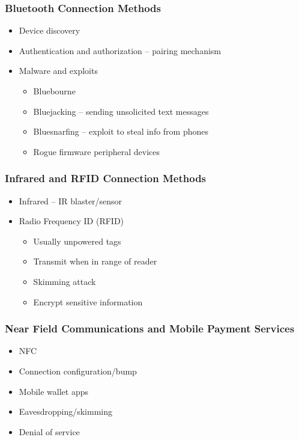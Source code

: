 		\subsubsection {Bluetooth Connection Methods}
			\begin{itemize}
				\item Device discovery
				\item Authentication and authorization -- pairing mechanism
				\item Malware and exploits
					\begin{itemize}
						\item Bluebourne
						\item Bluejacking -- sending unsolicited text messages
						\item Bluesnarfing -- exploit to steal info from phones
						\item Rogue firmware peripheral devices
					\end{itemize}
			\end{itemize}
		\subsubsection {Infrared and RFID Connection Methods}
			\begin{itemize}
				\item Infrared -- IR blaster/sensor
				\item Radio Frequency ID (RFID)
					\begin{itemize}
						\item Usually unpowered tags
						\item Transmit when in range of reader
						\item Skimming attack
						\item Encrypt sensitive information
					\end{itemize}
			\end{itemize}
		\subsubsection {Near Field Communications and Mobile Payment Services}
			\begin{itemize}
				\item NFC
				\item Connection configuration/bump
				\item Mobile wallet apps
				\item Eavesdropping/skimming
				\item Denial of service
			\end{itemize}
